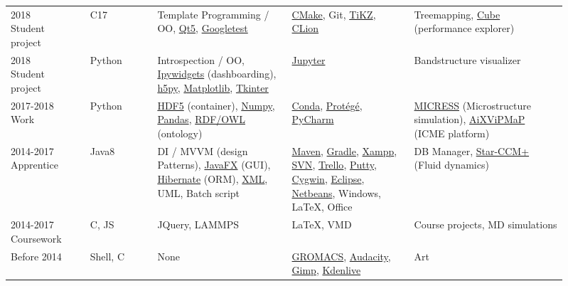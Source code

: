 \documentclass[11pt,a4paper]{moderncv}
\def\SymboCpp{C\raisebox{0.5ex}{\tiny\textbf{++}}}
\begin{document}
\begin{center}
{\begin{tabular}{p{0.13\linewidth} p{0.11\linewidth} >{\raggedright\arraybackslash}p{0.22\linewidth} >{\raggedright\arraybackslash}p{0.2\linewidth} >{\raggedright\arraybackslash}p{0.25\linewidth}}
      \makecell[l]{2018 \\ Student \\ project} & \SymboCpp{}17 & Template Programming / OO, \href{https://www.qt.io/}{Qt5}, \href{https://github.com/google/googletest}{Googletest} & \href{https://cmake.org/}{CMake}, Git, \href{https://texample.net/tikz/}{TiKZ}, \href{https://www.jetbrains.com/clion/}{CLion} & Treemapping, \href{https://www.scalasca.org/software/cube-4.x/}{Cube} (performance explorer)\\
      \makecell[l]{2018 \\Student \\ project} & Python & Introspection / OO, \href{https://github.com/jupyter-widgets/ipywidgets}{Ipywidgets} (dashboarding), \href{https://www.h5py.org/}{h5py}, \href{https://matplotlib.org/}{Matplotlib}, \href{https://docs.python.org/3/library/tk.html}{Tkinter} & \href{https://jupyter.org/}{Jupyter} & Bandstructure visualizer\\
      2017-2018 Work & Python & \href{https://www.hdfgroup.org/solutions/hdf5/}{HDF5} (container), \href{https://numpy.org}{Numpy}, \href{https://pandas.pydata.org/}{Pandas}, \href{https://www.w3.org/OWL/}{RDF/OWL} (ontology) & \href{https://anaconda.org/conda-forge/}{Conda}, \href{https://protege.stanford.edu/}{Protégé}, \href{https://www.jetbrains.com/pycharm/}{PyCharm} & \href{https://micress.rwth-aachen.de/}{MICRESS} (Microstructure simulation), \href{aixvipmap.de}{AiXViPMaP} (ICME platform)\\
      2014-2017 Apprentice & Java8 & DI / MVVM (design Patterns), \href{https://openjfx.io/}{JavaFX} (GUI), \href{https://hibernate.org/}{Hibernate} (ORM), \href{https://www.w3.org/TR/xml/}{XML}, UML, Batch script & \href{https://maven.apache.org/}{Maven}, \href{https://gradle.org/}{Gradle}, \href{https://www.apachefriends.org/index.html}{Xampp}, \href{https://subversion.apache.org/}{SVN}, \href{https://trello.com/}{Trello}, \href{https://www.putty.org/}{Putty}, \href{https://cygwin.com/}{Cygwin}, \href{https://www.eclipse.org/}{Eclipse}, \href{https://netbeans.apache.org//}{Netbeans}, Windows, \LaTeX{}, Office & DB Manager, \href{https://www.plm.automation.siemens.com/global/en/products/simcenter/STAR-CCM.html}{Star-CCM+} (Fluid dynamics)\\
      2014-2017 Coursework & \SymboCpp{}, JS & JQuery, LAMMPS & \LaTeX{}, VMD & Course projects, MD simulations\\
      Before 2014 & Shell, \SymboCpp{} & None & \href{https://www.gromacs.org/}{GROMACS}, \href{https://www.audacityteam.org/}{Audacity}, \href{https://www.gimp.org}{Gimp}, \href{https://kdenlive.org}{Kdenlive} & Art\\
    \end{tabular}
  }
\end{center}
\end{document}
